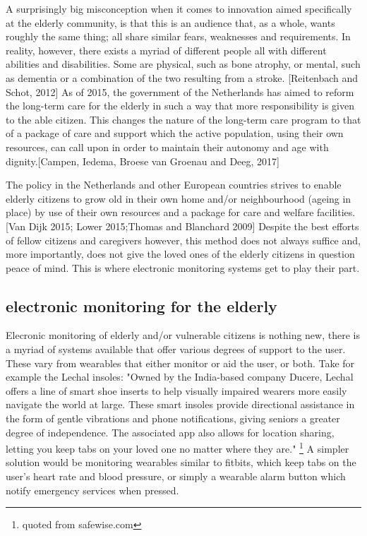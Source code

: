 \documentclass{below-ext}
\begin{document}
A surprisingly big misconception when it comes to innovation aimed specifically at the elderly community, is that this is an audience that, as a whole, wants roughly the same thing; all share similar fears, weaknesses and requirements. In reality, however, there exists a myriad of different people all with different abilities and disabilities. Some are physical, such as bone atrophy, or mental, such as dementia or a combination of the two resulting from a stroke. [Reitenbach and Schot, 2012]  As of 2015, the government of the Netherlands has aimed to reform the long-term care for the elderly in such a way that more responsibility is given to the able citizen. This changes the nature of the long-term care program to that of a package of care and support which the active population, using their own resources, can call upon in order to maintain their autonomy and age with dignity.[Campen, Iedema, Broese van Groenau and Deeg, 2017]

The policy in the Netherlands and other European countries strives to enable elderly citizens to grow old in their own home and/or neighbourhood (ageing in place) by use of their own resources and a package for care and welfare facilities. [Van Dijk 2015; Lower 2015;Thomas and Blanchard 2009] Despite the best efforts of fellow citizens and caregivers however, this method does not always suffice and, more importantly, does not give the loved ones of the elderly citizens in question peace of mind. This is where electronic monitoring systems get to play their part.

\subsection{electronic monitoring for the elderly}
Elecronic monitoring of elderly and/or vulnerable citizens is nothing new, there is a myriad of systems available that offer various degrees of support to the user. These vary from wearables that either monitor or aid the user, or both. Take for example the Lechal insoles: "Owned by the India-based company Ducere, Lechal offers a line of smart shoe inserts to help visually impaired wearers more easily navigate the world at large. These smart insoles provide directional assistance in the form of gentle vibrations and phone notifications, giving seniors a greater degree of independence. The associated app also allows for location sharing, letting you keep tabs on your loved one no matter where they are." \footnote{quoted from safewise.com} A simpler solution would be monitoring wearables similar to fitbits, which keep tabs on the user's heart rate and blood pressure, or simply a wearable alarm button which notify emergency services when pressed.
\end{document}
